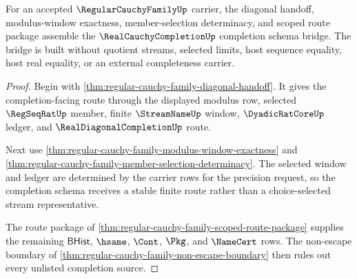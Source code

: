 \begin{theorem}
\label{thm:regular-cauchy-family-completion-schema-bridge}
For an accepted $\RegularCauchyFamilyUp$ carrier, the diagonal handoff, modulus-window exactness, member-selection determinacy, and scoped route package assemble the $\RealCauchyCompletionUp$ completion schema bridge. The bridge is built without quotient streams, selected limits, host sequence equality, host real equality, or an external completeness carrier.
\end{theorem}
\begin{proof}
Begin with \autoref{thm:regular-cauchy-family-diagonal-handoff}. It gives the completion-facing route through the displayed modulus row, selected $\RegSeqRatUp$ member, finite $\StreamNameUp$ window, $\DyadicRatCoreUp$ ledger, and $\RealDiagonalCompletionUp$ route.

Next use \autoref{thm:regular-cauchy-family-modulus-window-exactness} and \autoref{thm:regular-cauchy-family-member-selection-determinacy}. The selected window and ledger are determined by the carrier rows for the precision request, so the completion schema receives a stable finite route rather than a choice-selected stream representative.

The route package of \autoref{thm:regular-cauchy-family-scoped-route-package} supplies the remaining $\mathsf{BHist}$, $\hsame$, $\Cont$, $\Pkg$, and $\NameCert$ rows. The non-escape boundary of \autoref{thm:regular-cauchy-family-non-escape-boundary} then rules out every unlisted completion source.
\end{proof}

